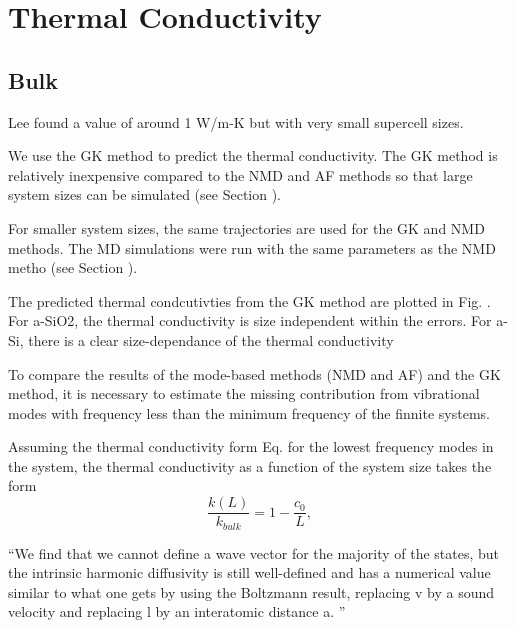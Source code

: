 \documentclass[aps,prb,twocolumn,superscriptaddress,footinbib,amsmath,amssymb,floatfix]{revtex4}
\begin{document}

\section{\label{S:Conductivity}Thermal Conductivity}

\subsection{\label{S:Bulk}Bulk}

Lee found a value of around 1 W/m-K 
but with very small supercell sizes.\cite{lee_molecular-dynamics_1991}

We use the GK method to predict the thermal conductivity. The GK method 
is relatively inexpensive compared to the NMD and AF methods so that 
large system sizes 
can be simulated (see Section ).  

For smaller system sizes, the same trajectories are used for the GK and 
NMD methods. The MD simulations were run with the same parameters 
as the NMD metho (see Section ). 

The predicted thermal condcutivties from the GK method are plotted 
in Fig. . For a-SiO2, the thermal conductivity is size independent 
within the errors.  For a-Si, there is a clear size-dependance of the 
thermal conductivity

To compare the results of the mode-based methods (NMD and AF) and 
the GK method, it is necessary to estimate the missing contribution from 
vibrational modes with frequency less than the minimum frequency of 
the finnite systems. 

Assuming the thermal conductivity form Eq.  for the lowest frequency modes in 
the system, the thermal conductivity as a function of the system size 
takes the form
\begin{equation}\label{EQ:k0}
\frac{k(L)}{k_{bulk}} = 1 - \frac{c_0}{L},
\end{equation}

``We find that we cannot define a wave vector for the
majority of the states, but the intrinsic harmonic diffusivity is still well-defined and has a numerical value
similar to what one gets by using the Boltzmann result, replacing v by a sound velocity and replacing l by
an interatomic distance a.
''\cite{feldman_thermal_1993}
\end{document}
